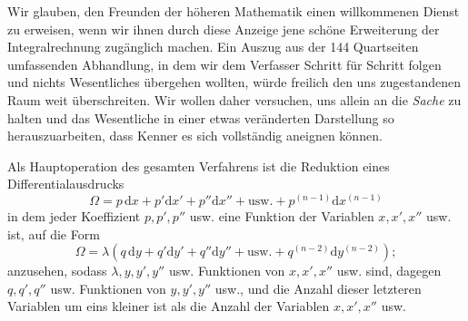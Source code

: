 Wir glauben, den Freunden der höheren Mathematik einen willkommenen Dienst zu erweisen, wenn wir ihnen durch diese Anzeige jene schöne Erweiterung der Integralrechnung zugänglich machen. Ein Auszug aus der 144 Quartseiten umfassenden Abhandlung, in dem wir dem Verfasser Schritt für Schritt folgen und nichts Wesentliches übergehen wollten, würde freilich den uns zugestandenen Raum weit überschreiten. Wir wollen daher versuchen, uns allein an die \textit{Sache} zu halten und das Wesentliche in einer etwas veränderten Darstellung so herauszuarbeiten, dass Kenner es sich vollständig aneignen können.

Als Hauptoperation des gesamten Verfahrens ist die Reduktion eines Differentialausdrucks
\[
\Omega=p\,\mathrm dx+p'\mathrm dx'+p''\mathrm dx''+\text{usw.}+p^{(n-1)}\mathrm dx^{(n-1)}
\]
in dem jeder Koeffizient $p,p',p''$ usw. eine Funktion der Variablen $x,x',x''$ usw. ist, auf die Form
\[
\Omega=\lambda(q\,\mathrm dy+q'\mathrm dy'+q''\mathrm dy''+\text{usw.}+q^{(n-2)}\mathrm dy^{(n-2)});
\]
anzusehen, sodass $\lambda,y,y',y''$ usw. Funktionen von $x,x',x''$ usw. sind, dagegen $q,q',q''$ usw. Funktionen von $y,y',y''$ usw., und die Anzahl dieser letzteren Variablen um eins kleiner ist als die Anzahl der Variablen $x,x',x''$ usw.


